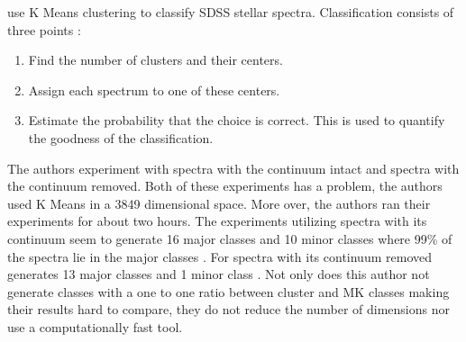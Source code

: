 \documentclass[./AutomatedMK.tex]{subfiles}
\begin{document}
\citeauthor{Almeida} use K Means clustering to classify SDSS stellar spectra. Classification consists of three points \citep{Almeida}:
\begin{enumerate}
\item Find the number of clusters and their centers.
\item Assign each spectrum to one of these centers.
\item Estimate the probability that the choice is correct. This is used to quantify the goodness of the classification.
\end{enumerate}
\noindent The authors experiment with spectra with the continuum intact and spectra with the continuum removed. Both of these experiments has a problem,  the authors used K Means in a 3849 dimensional space. More over, the authors ran their experiments for about two hours. The experiments utilizing spectra with its continuum seem to generate 16 major classes and 10 minor classes where 99\% of the spectra lie in the major classes \citep{Almeida}. For spectra with its continuum removed generates 13 major classes and 1 minor class \citep{Almeida}. Not only does this author not generate classes with a one to one ratio between cluster and MK classes making their results hard to compare, they do not reduce the number of dimensions nor use a computationally fast tool. 
\end{document}
